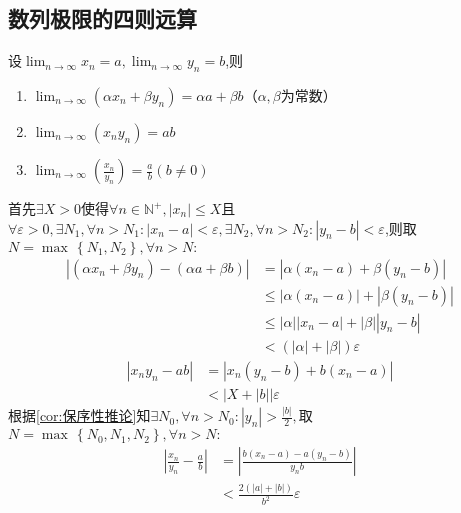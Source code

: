 \subsection{数列极限的四则远算}
\begin{formal}
    \begin{theorem}[极限的四则运算]\label{thm:极限的四则运算}
        设$\displaystyle \lim_{n\to\infty}x_n=a,\lim_{n\to\infty}y_n=b$,则\begin{enumerate}[label={\textup{(\arabic*)}}]
            \item $\lim_{n\to\infty}\left(\alpha x_n+\beta y_n\right)=\alpha a+\beta b$（$\alpha,\beta$为常数）
            \item $\displaystyle \lim_{n\to\infty}\left(x_ny_n\right)=ab$
            \item $\displaystyle \lim_{n\to\infty}\left(
                \frac{x_n}{y_n}
            \right)=\frac{a}{b}\left(b\neq 0\right)$
        \end{enumerate}
    \end{theorem}
    \begin{Proof}
        首先$\exists X>0$使得$\forall n\in\mathbb{N}^+,\left|x_n\right|\leqslant X$且$\forall \varepsilon>0,\exists N_1,\forall n>N_1:\left|x_n-a\right|<\varepsilon ,\exists N_2,\forall n>N_2:\left|y_n-b\right|<\varepsilon$,则取$N=\max\,\left\{N_1,N_2\right\},\forall n>N:$\begin{align*}
        \left|
            \left(\alpha x_n+\beta y_n\right)-\left(\alpha a+\beta b\right)
        \right|&=\left|
            \alpha\left(x_n-a\right)+\beta\left(y_n-b\right)
        \right|\\
        &\leqslant \left|
            \alpha\left(x_n-a\right)
        \right|+\left|
            \beta\left(y_n-b\right)
        \right|\\
        &\leqslant\left|\alpha\right|\left|x_n-a\right|+\left|\beta\right|\left|y_n-b\right|\\
        &<\left(\left|\alpha\right|+\left|\beta\right|\right)\varepsilon
        \end{align*}\begin{align*}
            \left|x_ny_n-ab\right|&=\left|
                x_n\left(y_n-b\right)+b\left(x_n-a\right)
            \right|\\
            &<\left|X+\left|b\right|\right|\varepsilon
        \end{align*}
        根据\cref{cor:保序性推论}知$\displaystyle \exists N_0,\forall n>N_0:\left|y_n\right|>\frac{\left|b\right|}{2},$取$N=\max\,\left\{
            N_0,N_1,N_2
        \right\},\forall n>N:$\begin{align*}
        \left|
            \frac{x_n}{y_n}-\frac{a}{b}
        \right|&=\left|
            \frac{b\left(x_n-a\right)-a\left(y_n-b\right)}{y_nb}
        \right|\\
        &<\frac{2\left(\left|a\right|+\left|b\right|\right)}{b^2}\varepsilon
        \end{align*}
    \end{Proof}
\end{formal}
